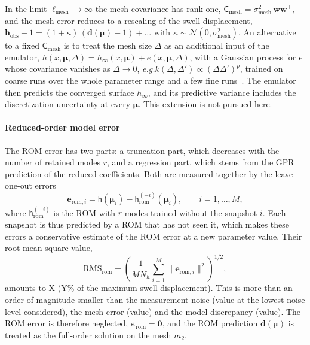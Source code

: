 \documentclass{elsarticle}
\newcommand{\eg}{\emph{e.g.}\xspace}
\newcommand{\rai}[1]{{\color{red}#1}}
\renewcommand{\vec}[1]{\boldsymbol{#1}}
\newcommand{\mat}[1]{\mathsf{#1}}
\newcommand{\params}{\boldsymbol{\mu}}
\newcommand{\submesh}{\mathrm{mesh}}        %
\newcommand{\obs}{\mathrm{obs}}
\newcommand{\rom}{\mathrm{rom}}
\begin{document}
In the limit $\ell_{\submesh}\to\infty$ the mesh covariance has rank one,
$\mat{C}_{\submesh} = \sigma_{\submesh}^{2}\,\vec{w}\vec{w}^{\top}$, and the
mesh error reduces to a rescaling of the swell displacement,
$\vec{h}_{\obs} - 1 = (1+\kappa)\,(\vec{d}(\params) - 1) + \dots$ with
$\kappa\sim\mathcal{N}(0,\sigma_{\submesh}^{2})$. An alternative to a fixed
$\mat{C}_{\submesh}$ is to treat the mesh size $\Delta$ as an additional input
of the emulator, $h(x,\params,\Delta) = h_{\infty}(x,\params)
+ e(x,\params,\Delta)$, with a Gaussian process for $e$ whose covariance
vanishes as $\Delta\to0$, \eg $k(\Delta,\Delta')\propto(\Delta\Delta')^{p}$,
trained on coarse runs over the whole parameter range and a few fine
runs~\cite{kennedy2000predicting,tuo2014surrogate}. The emulator then predicts
the converged surface $h_{\infty}$, and its predictive variance includes the
discretization uncertainty at every $\params$. This extension is not pursued
here.

\paragraph{Reduced-order model error}
The ROM error has two parts: a truncation part, which decreases with the number
of retained modes $r$, and a regression part, which stems from the GPR
prediction of the reduced coefficients. Both are measured together by the
leave-one-out errors
\begin{equation}
\vec{e}_{\rom,i}
= \mat{h}(\params_i) - \mat{h}_{\mathrm{rom}}^{(-i)}(\params_i),
\qquad i=1,\dots,M,
\label{eq:loo_errors}
\end{equation}
where $\mat{h}_{\mathrm{rom}}^{(-i)}$ is the ROM with $r$ modes trained without
the snapshot $i$. Each snapshot is thus predicted by a ROM that has not seen
it, which makes these errors a conservative estimate of the ROM error at a new
parameter value. Their root-mean-square value,
\begin{equation}
\mathrm{RMS}_{\rom}
= \left(\frac{1}{M N_h}\sum_{i=1}^{M}
  \bigl\|\vec{e}_{\rom,i}\bigr\|^{2}\right)^{1/2},
\label{eq:loo_rms}
\end{equation}
amounts to \rai{X} (\rai{Y}\% of the maximum swell displacement). This is
\rai{more than an order of magnitude} smaller than the measurement noise
(\rai{value} at the lowest noise level considered), the mesh error
(\rai{value}) and the model discrepancy (\rai{value}). The ROM error is
therefore neglected, $\vec{\varepsilon}_{\rom}=\vec{0}$, and the ROM prediction
$\vec{d}(\params)$ is treated as the full-order solution on the mesh $m_2$.
\end{document}
